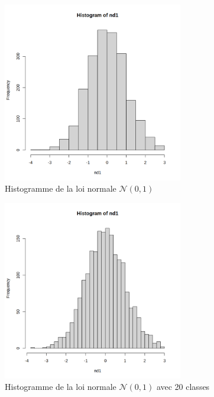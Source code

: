 \begin{table}[H]
\begin{minipage}{0.28\textwidth}
                 \end{minipage}
                \hfill
                \begin{minipage}{0.28\textwidth}
                    \centering
                    \begin{figure}[H]
                        \centering
                        \includegraphics[width=0.7\textwidth]{4_attachments/figures/output22.png}
                        \caption{Histogramme de la loi normale $\mathcal N(0,1)$}
                        \label{fig:fig2}
                    \end{figure}
                    
                \end{minipage}
                \hfill
                \begin{minipage}{0.28\textwidth}
                    \centering
                    \begin{figure}[H]
                        \centering
                        \includegraphics[width=0.7\textwidth]{4_attachments/figures/output23.png}
                        \caption{ Histogramme de la loi normale $\mathcal N(0,1)$ avec 20 classes}
                        \label{fig:fig3}
                    \end{figure}
                    
                \end{minipage}
              \end{table}

